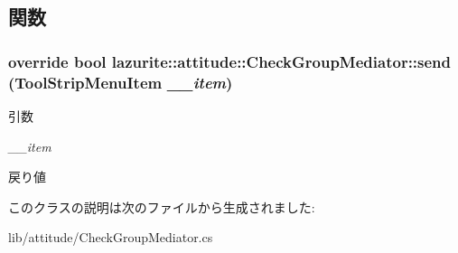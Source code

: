 \subsection{関数}
\hypertarget{classlazurite_1_1attitude_1_1_check_group_mediator_a596352b6ebd534450a53065f9f689030}{
\subsubsection[{send}]{\setlength{\rightskip}{0pt plus 5cm}override bool lazurite::attitude::CheckGroupMediator::send (ToolStripMenuItem {\em \_\-\_\-item})}}
\label{classlazurite_1_1attitude_1_1_check_group_mediator_a596352b6ebd534450a53065f9f689030}

\begin{DoxyParams}{引数}
\item[{\em \_\-\_\-item}]\end{DoxyParams}
\begin{DoxyReturn}{戻り値}

\end{DoxyReturn}


このクラスの説明は次のファイルから生成されました:\begin{DoxyCompactItemize}
\item 
lib/attitude/CheckGroupMediator.cs\end{DoxyCompactItemize}
